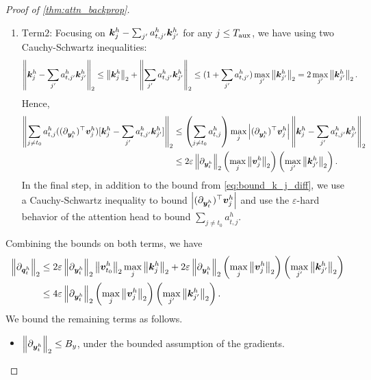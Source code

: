 \begin{proof}[Proof of \cref{thm:attn_backprop}]
\begin{enumerate}
        \item $\mathrm{Term 2}$: Focusing on ${\bm{k}}^h_{j} - \sum_{j'} a^h_{t, j'} {\bm{k}}^{h}_{j'}$ for any $j \le T_{\text{aux}}$, we have using two Cauchy-Schwartz inequalities:
        \begin{align}
            \left\|{\bm{k}}^h_{j} - \sum_{j'} a^h_{t, j'} {\bm{k}}^{h}_{j'}\right\|_2 &\leq \left\|{\bm{k}}^h_j\right\|_2 + \left\| \sum_{j'} a^h_{t, j'} {\bm{k}}^{h}_{j'} \right\|_2 
            \leq (1 + \sum_{j'} a^h_{t, j'}) \max_{j'} \left\| {\bm{k}}^{h}_{j'} \right\|_2  = 2 \max_{j'} \left\| {\bm{k}}^{h}_{j'} \right\|_2 \label{eq:bound_k_j_diff}. 
        \end{align}
        Hence,
        \begin{align*}
            \left\| \sum_{j \ne t_0} a^h_{t, j} ( (\partial_{{\bm{y}}_t^h})^{\top} {\bm{v}}^{h}_j ) [ {\bm{k}}^h_j - \sum_{j'} a^h_{t, j'} {\bm{k}}^{h}_{j'} ] \right\|_2 &\leq  \left( \sum_{ j \ne t_0 } a^h_{t, j} \right) \max_j \left|  (\partial_{{\bm{y}}_t^h})^{\top} {\bm{v}}^{h}_j  \right|  \left\| {\bm{k}}^h_j - \sum_{j'} a^h_{t, j'} {\bm{k}}^{h}_{j'} \right\|_2 \\&
            \leq 2\varepsilon \left\| \partial_{ {\bm{y}}_t^h } \right\|_2 \left( \max_j \left\| {\bm{v}}_j^h \right\|_2 \right) \left( \max_{j'} \left\| {\bm{k}}^{h}_{j'} \right\|_2 \right)
            .
        \end{align*}
        In the final step, in addition to the bound from \cref{eq:bound_k_j_diff}, we use a  Cauchy-Schwartz inequality to bound $\left|  (\partial_{{\bm{y}}_t^h})^{\top} {\bm{v}}^{h}_j  \right|$ and use the $\varepsilon$-hard behavior of the attention head to bound $\sum_{j \ne t_0} a^h_{t, j}.$
        
        
    \end{enumerate}
    Combining the bounds on both terms, we have
    \begin{align*}
        \left\| \partial_{ {\bm{q}}^h_t } \right\|_2 &\leq 2 \varepsilon \left\| \partial_{{\bm{y}}_t^h} \right\|_2 \left\| {\bm{v}}^{h}_{t_0} \right\|_2   \max_{j} \left\| {\bm{k}}^h_j \right\|_2 + 2\varepsilon \left\| \partial_{ {\bm{y}}_t^h } \right\|_2 \left( \max_j \left\| {\bm{v}}_j^h \right\|_2 \right) \left( \max_{j'} \left\| {\bm{k}}^{h}_{j'} \right\|_2 \right) \\& \leq 4 \varepsilon \left\| \partial_{ {\bm{y}}_t^h } \right\|_2 \left( \max_j \left\| {\bm{v}}_j^h \right\|_2 \right) \left( \max_{j'} \left\| {\bm{k}}^{h}_{j'} \right\|_2 \right).
    \end{align*}
    We bound the remaining terms as follows.
    \begin{itemize}
        \item $\left\| \partial_{ {\bm{y}}_t^h } \right\|_2 \le B_y$, under the bounded assumption of the gradients.


\end{itemize}
\end{proof}
